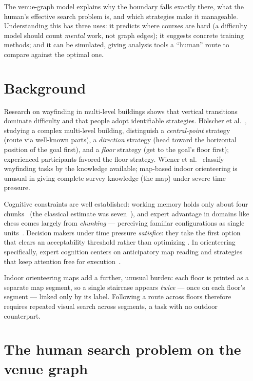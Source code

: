 \documentclass[11pt,a4paper,twocolumn]{article}
\begin{document}
The venue-graph model explains why the boundary falls exactly there, what the
human's effective search problem is, and which strategies make it manageable.
Understanding this has three uses: it predicts where courses are hard (a
difficulty model should count \emph{mental} work, not graph edges); it
suggests concrete training methods; and it can be simulated, giving analysis
tools a ``human'' route to compare against the optimal one.

\section{Background}

Research on wayfinding in multi-level buildings shows that vertical
transitions dominate difficulty and that people adopt identifiable
strategies. H\"olscher et al.~\cite{holscher2006}, studying a complex
multi-level building, distinguish a \emph{central-point} strategy (route via
well-known parts), a \emph{direction} strategy (head toward the horizontal
position of the goal first), and a \emph{floor} strategy (get to the goal's
floor first); experienced participants favored the floor strategy.
Wiener et al.~\cite{wiener2009} classify wayfinding tasks by the knowledge
available; map-based indoor orienteering is unusual in giving complete
survey knowledge (the map) under severe time pressure.

Cognitive constraints are well established: working memory holds only about
four chunks~\cite{cowan2001} (the classical estimate was seven~\cite{miller1956}),
and expert advantage in domains like chess comes largely from \emph{chunking}
--- perceiving familiar configurations as single units~\cite{chase1973}.
Decision makers under time pressure \emph{satisfice}: they take the first
option that clears an acceptability threshold rather than optimizing
\cite{simon1956}. In orienteering specifically, expert cognition centers on
anticipatory map reading and strategies that keep attention free for
execution~\cite{eccles2002}.

Indoor orienteering maps add a further, unusual burden: each floor is printed
as a separate map segment, so a single staircase appears \emph{twice} --- once
on each floor's segment --- linked only by its label. Following a route across
floors therefore requires repeated visual search across segments, a task with
no outdoor counterpart.

\section{The human search problem on the venue graph}
\end{document}

